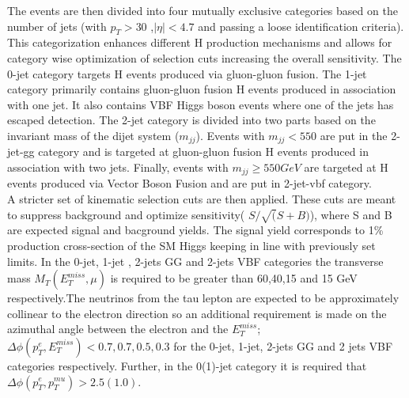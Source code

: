 \documentclass[a4paper,11pt]{article}
\begin{document}
The events are then divided into four mutually exclusive categories  based on the number of jets (with $p_{T}>30$ ,$|\eta|<4.7$ and passing a loose identification criteria). This categorization enhances different H production mechanisms and allows for category wise optimization of selection cuts increasing the overall sensitivity. The 0-jet category targets H events produced via gluon-gluon fusion. The 1-jet category primarily contains gluon-gluon fusion H events produced in association with one jet. It also contains VBF Higgs boson events where one of the jets has escaped detection. The 2-jet category is divided into two parts based on the invariant mass of the dijet system ($m_{jj}$). Events with $m_{jj}<550$ are put in the 2-jet-gg category and is targeted at gluon-gluon fusion H events produced in association with two jets. Finally, events with $m_{jj} \geq 550 GeV$ are targeted at H events produced via Vector Boson Fusion and are put in 2-jet-vbf category.\\

A stricter set of kinematic selection cuts are then applied. These cuts are meant to suppress background and optimize sensitivity( $S/\sqrt(S+B)$), where S and B are expected signal and bacground yields. The signal yield corresponds to 1\% production cross-section of the SM Higgs keeping in line with previously set limits. In the 0-jet, 1-jet , 2-jets GG and 2-jets VBF categories the transverse mass $M_{T}(E_{T}^{miss}, \mu)$ is required to be greater than 60,40,15 and 15 GeV respectively.The neutrinos from the tau lepton are expected to be approximately collinear to the electron direction so an additional requirement is made on the azimuthal angle between the electron and the $E_{T}^{miss}$;  $\Delta\phi(p_{T}^e, E_{T}^{miss}) < 0.7,0.7,0.5,0.3$ for the 0-jet, 1-jet, 2-jets GG and 2 jets VBF categories respectively. Further, in the 0(1)-jet category it is required that $\Delta\phi(p_{T}^e, p_{T}^{mu}) >2.5 (1.0)$.
\end{document}
